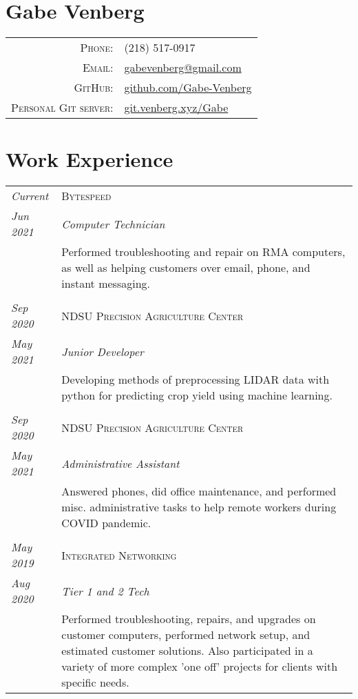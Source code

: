 \documentclass[letterpaper,10pt]{article}
\begin{document}
\pagestyle{empty}%
\section*{Gabe Venberg}
	\begin{tabular}{rl}
	\textsc{Phone:} & (218) 517-0917\\
	\textsc{Email:} & \href{mailto:gabevenberg@gmail.com}{gabevenberg@gmail.com}\\
	\textsc{GitHub:} & \href{https://github.com/Gabe-Venberg}{github.com/Gabe-Venberg}\\
	\textsc{Personal Git server:} & \href{https://git.venberg.xyz/Gabe}{git.venberg.xyz/Gabe}\\
	\end{tabular}
\section*{Work Experience}
	\begin{tabular}{R{2cm}|p{14cm}}
	\textsl{Current}	& \textsc{Bytespeed}\\
	\textsl{Jun 2021}	& \emph{Computer Technician}\\
	& Performed troubleshooting and repair on RMA computers, as well as helping customers over email, phone, and instant messaging.\\
	\\
	\textsl{Sep 2020}	& \textsc{NDSU Precision Agriculture Center}\\
	\textsl{May 2021}	& \emph{Junior Developer}\\
	& Developing methods of preprocessing LIDAR data with python for predicting crop yield using machine learning.\\
	\\
	\textsl{Sep 2020}	& \textsc{NDSU Precision Agriculture Center}\\
	\textsl{May 2021}	& \emph{Administrative Assistant}\\
	& Answered phones, did office maintenance, and performed misc. administrative tasks to help remote workers during COVID pandemic.\\
	\\
	\textsl{May 2019}	& \textsc{Integrated Networking}\\
	\textsl{Aug 2020}	& \emph{Tier 1 and 2 Tech}\\
	& Performed troubleshooting, repairs, and upgrades on customer computers, performed network setup, and estimated customer solutions.
	Also participated in a variety of more complex 'one off' projects for clients with specific needs.\\
	\end{tabular}
\end{document}
